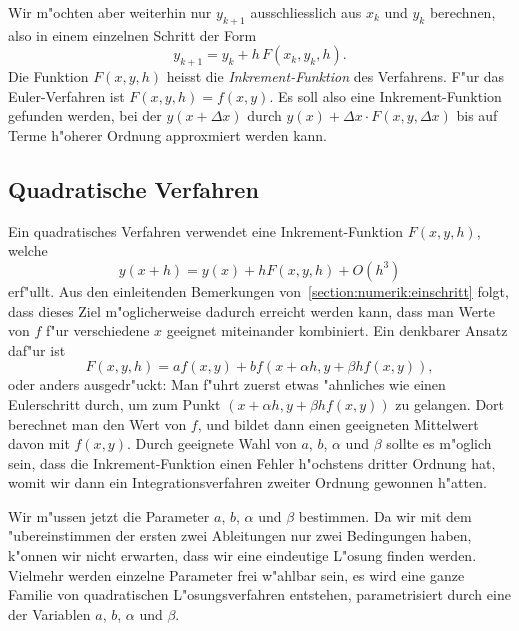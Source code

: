 Wir m"ochten aber weiterhin nur $y_{k+1}$ ausschliesslich aus $x_k$ und $y_k$
berechnen, also in einem einzelnen Schritt der Form
\[
y_{k+1}=y_k + h\, F(x_k, y_k, h).
\]
Die Funktion $F(x,y,h)$ heisst die {\em Inkrement-Funktion}
des Verfahrens.
F"ur das Euler-Verfahren ist $F(x,y,h)=f(x,y)$.
Es soll also eine Inkrement-Funktion gefunden werden, bei der $y(x+\Delta x)$
durch $y(x) + \Delta x\cdot F(x,y,\Delta x)$ bis auf Terme h"oherer
Ordnung approxmiert werden kann.

\subsection{Quadratische Verfahren}
Ein quadratisches Verfahren verwendet eine Inkrement-Funktion $F(x,y,h)$,
welche
\[
y(x+h)=y(x)+hF(x,y,h)+O(h^3)
\]
erf"ullt.
Aus den einleitenden Bemerkungen von~\ref{section:numerik:einschritt}
folgt, dass dieses Ziel m"oglicherweise dadurch erreicht werden kann,
dass man Werte von $f$ f"ur verschiedene $x$ geeignet miteinander
kombiniert.
Ein denkbarer Ansatz daf"ur ist
\[
F(x,y,h)=af(x,y) + bf(x+\alpha h, y +\beta hf(x,y)),
\]
oder anders ausgedr"uckt: Man f"uhrt zuerst etwas "ahnliches wie einen
Eulerschritt durch, um zum Punkt $(x+\alpha h,y+\beta hf(x,y))$ zu
gelangen.
Dort berechnet man den Wert von $f$, und bildet dann einen geeigneten
Mittelwert davon  mit $f(x,y)$.
Durch geeignete Wahl von $a$, $b$, $\alpha$ und $\beta$ sollte es m"oglich
sein, dass die Inkrement-Funktion einen Fehler h"ochstens dritter Ordnung
hat, womit wir dann ein Integrationsverfahren zweiter Ordnung gewonnen
h"atten.

Wir m"ussen jetzt die Parameter $a$, $b$, $\alpha$ und $\beta$ bestimmen.
Da wir mit dem "ubereinstimmen der ersten zwei Ableitungen
nur zwei Bedingungen haben, k"onnen wir nicht erwarten, dass wir
eine eindeutige L"osung finden werden.
Vielmehr werden einzelne Parameter frei w"ahlbar sein, es wird eine
ganze Familie von quadratischen L"osungsverfahren entstehen, parametrisiert
durch eine der Variablen $a$, $b$, $\alpha$ und $\beta$.

